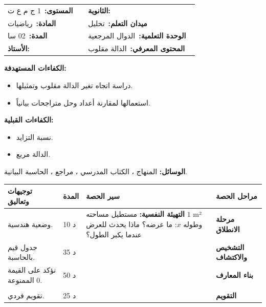 \documentclass[12pt,a4paper]{article}
\makeatletter
\newenvironment{LTR}{\begin{otherlanguage}{english}}{\end{otherlanguage}}
\newcommand{\ar}[1]{\foreignlanguage{arabic}{#1}}
\newcommand{\R}{\mathbb{R}}
\newcommand{\Phase}[1]{\textbf{#1}}
\newcommand{\Fld}[2]{\textbf{#1:}\ #2}
\newcommand{\ModhHead}[9]{%
\begin{LTR}
\begin{tcolorbox}[enhanced,colback=white,colframe=cThm!85!black,arc=4mm,boxrule=1pt,top=14pt,bottom=6pt,left=8pt,right=8pt,
 overlay={\node[fill=cThm!85!black,text=white,rounded corners=3mm,inner xsep=14pt,inner ysep=4pt,font=\large\bfseries] at ([yshift=0pt]frame.north){\ar{مذكرة رقم #1}};},
 before upper={\selectlanguage{arabic}}]
\begin{tabular}{@{}p{0.4\linewidth}p{0.55\linewidth}@{}}
\Fld{المستوى}{#2} & \Fld{الثانوية}{\dotfill}\\[3pt]
\Fld{المادة}{رياضيات} & \Fld{ميدان التعلم}{#3}\\[3pt]
\Fld{المدة}{#5} & \Fld{الوحدة التعلمية}{#4}\\[3pt]
\Fld{الأستاذ}{\dotfill} & \Fld{المحتوى المعرفي}{#6}\\
\end{tabular}
\end{tcolorbox}
\begin{tcolorbox}[enhanced,colback=white,colframe=cThm!85!black,arc=3mm,boxrule=0.8pt,sidebyside,sidebyside align=top,lefthand ratio=0.5,
 segmentation style={dashed,cThm!60},before upper={\selectlanguage{arabic}},before lower={\selectlanguage{arabic}}]
\textbf{الكفاءات المستهدفة:}\par #8
\tcblower
\textbf{الكفاءات القبلية:}\par #7
\end{tcolorbox}
\end{LTR}
\par\smallskip\textbf{الوسائل:} #9\par\smallskip}
\newenvironment{Sayr}{%
\begin{LTR}\renewcommand{\arraystretch}{1.25}
\begin{longtable}{|p{0.17\textwidth}|>{\centering\arraybackslash}p{0.06\textwidth}|p{0.53\textwidth}|>{\centering\arraybackslash}p{0.12\textwidth}|}
\hline\rowcolor{cThm!12}\ar{\textbf{توجيهات وتعاليق}} & \ar{\textbf{المدة}} & \ar{\textbf{سير الحصة}} & \ar{\textbf{مراحل الحصة}}\\\hline\endhead
\hline\endfoot}{\end{longtable}\end{LTR}}
\newcommand{\Row}[4]{\ar{\small #4} & \ar{#3} & \ar{#2} & \cellcolor{cThm!8}\ar{\Phase{#1}}\\\hline}
\newcommand{\Lab}[2]{\foreignlanguage{english}{\tcbox[on line,colback=#1,colframe=#1,boxrule=0pt,arc=2pt,boxsep=1pt,left=5pt,right=5pt,top=1pt,bottom=1pt]{\ar{\textcolor{white}{\textbf{#2}}}}}}
\newcommand{\Num}[1]{\foreignlanguage{english}{\tikz[baseline=(c.base)]\node[fill=cDef,text=white,inner sep=2pt,font=\footnotesize\bfseries](c){#1};}}
\newcommand{\ck}{\ensuremath{{\color{cRem}\checkmark}}}
\makeatother
\begin{document}
\newpage
\ModhHead{25}{1 ج م ع ت}{تحليل}{الدوال المرجعية}{02 سا}{الدالة مقلوب}%
{\begin{itemize}\item نسبة التزايد.\item الدالة مربع.\end{itemize}}%
{\begin{itemize}\item دراسة اتجاه تغير الدالة مقلوب وتمثيلها.\item استعمالها لمقارنة أعداد وحل متراجحات بيانياً.\end{itemize}}%
{المنهاج ، الكتاب المدرسي ، مراجع ، الحاسبة البيانية.}
\begin{Sayr}
\Row{مرحلة الانطلاق}{%
\textbf{التهيئة النفسية:} مستطيل مساحته $1$ m² وطوله $x$: ما عرضه؟ ماذا يحدث للعرض عندما يكبر الطول؟}{10 د}{وضعية هندسية.}
\Row{التشخيص والاكتشاف}{%
\Lab{cEx}{وضعية مقترحة}\par\ck\ العرض $\dfrac1x$ حيث $x>0$.\par
\ck\ الجدول: $x=0{,}5$: $2$ ؛ $x=1$: $1$ ؛ $x=2$: $0{,}5$ ؛ $x=4$: $0{,}25$: كلما كبر الطول صغر العرض.\par
}{35 د}{جدول قيم بالحاسبة.}
\Row{بناء المعارف}{%
\Lab{cThm}{خاصية}\ الدالة مقلوب $x\mapsto\dfrac1x$ معرفة على $\R^*$ ، و $\dfrac{f(b)-f(a)}{b-a}=-\dfrac1{ab}$.\par\ck\ على $]0;+\infty[$ ($ab>0$): متناقصة تماماً ؛ وعلى $]-\infty;0[$ أيضاً متناقصة تماماً.\par
\ck\ الدالة فردية ، ومنحناها \textbf{قطع زائد} مركز تناظره المبدأ.\par
\Lab{cThm!80!black}{حذار}\ الدالة مقلوب ليست متناقصة على $\R^*$ كله: $-1<1$ و $\dfrac1{-1}<\dfrac11$.\par}{50 د}{نؤكد على القيمة الممنوعة $0$.}
\Row{}{%
\Lab{cEx}{مثال}\par\ck\ $0<0{,}3<0{,}31$ ، إذن $\dfrac1{0{,}3}>\dfrac1{0{,}31}$.\par
\ck\ بيانياً: $\dfrac1x<2\iff x<0$ أو $x>\dfrac12$.\par
}{}{}
\Row{التقويم}{%
\Lab{cEx}{تطبيق}\par\Num{1} قارن $\dfrac1{-2}$ و $\dfrac1{-3}$. \Num{2} إذا كان $2\leqslant x\leqslant5$ فما حصر $\dfrac1x$ ؟\par\textbf{الحل:} \Num{1} $-3<-2<0$ والدالة متناقصة على $]-\infty;0[$: $\dfrac1{-3}>\dfrac1{-2}$ ؛ \Num{2} $\dfrac15\leqslant\dfrac1x\leqslant\dfrac12$.\par\textbf{واجب منزلي:} تمارين من الكتاب المدرسي.\par\smallskip\textbf{ملاحظات حول سير الحصة:} \dotfill}{25 د}{تقويم فردي.}
\end{Sayr}
\end{document}

